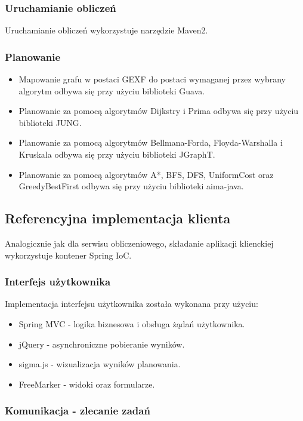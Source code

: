 \subsubsection{Uruchamianie obliczeń}

Uruchamianie obliczeń wykorzystuje narzędzie Maven2.

\subsubsection{Planowanie}

\begin{itemize}
	\item Mapowanie grafu w postaci GEXF do postaci wymaganej przez wybrany algorytm odbywa się przy użyciu biblioteki Guava.
	\item Planowanie za pomocą algorytmów Dijkstry i Prima odbywa się przy użyciu biblioteki JUNG.
	\item Planowanie za pomocą algorytmów Bellmana-Forda, Floyda-Warshalla i Kruskala odbywa się przy użyciu biblioteki JGraphT.
	\item Planowanie za pomocą algorytmów A*, BFS, DFS, UniformCost oraz GreedyBestFirst odbywa się przy użyciu biblioteki aima-java.
\end{itemize}

\subsection{Referencyjna implementacja klienta}

Analogicznie jak dla serwisu obliczeniowego, składanie aplikacji klienckiej wykorzystuje kontener Spring IoC.

\subsubsection{Interfejs użytkownika}

Implementacja interfejsu użytkownika została wykonana przy użyciu:
\begin{itemize}
	\item Spring MVC - logika biznesowa i obsługa żądań użytkownika.
	\item jQuery - asynchroniczne pobieranie wyników.
	\item sigma.js - wizualizacja wyników planowania.
	\item FreeMarker - widoki oraz formularze.
\end{itemize}

\subsubsection{Komunikacja - zlecanie zadań}

